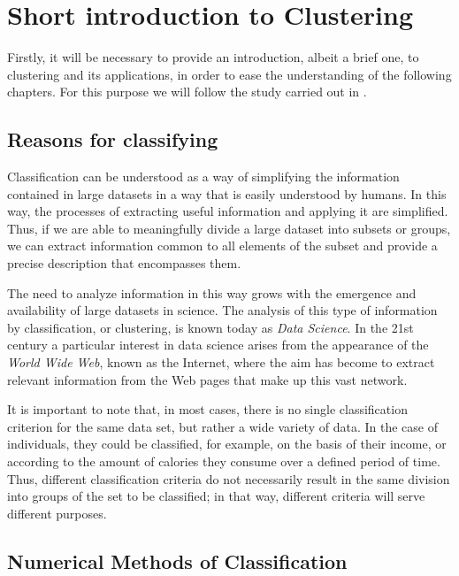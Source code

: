 
\chapter{Short introduction to Clustering}\label{ch:IntroClustering}

Firstly, it will be necessary to provide an introduction, albeit a brief one, to clustering and its applications, in order to ease the understanding of the following chapters. For this purpose we will follow the study carried out in \cite{Everitt:2009:CA:1538772}.

\section{Reasons for classifying}

Classification can be understood as a way of simplifying the information contained in large datasets in a way that is easily understood by humans. In this way, the processes of extracting useful information and applying it are simplified. Thus, if we are able to meaningfully divide a large dataset into subsets or groups, we can extract information common to all elements of the subset and provide a precise description that encompasses them.

The need to analyze information in this way grows with the emergence and availability of large datasets in science. The analysis of this type of information by classification, or clustering, is known today as \textit{Data Science}. In the 21st century a particular interest in data science arises from the appearance of the \textit{World Wide Web}, known as the Internet, where the aim has become to extract relevant information from the Web pages that make up this vast network.

It is important to note that, in most cases, there is no single classification criterion for the same data set, but rather a wide variety of data. In the case of individuals, they could be classified, for example, on the basis of their income, or according to the amount of calories they consume over a defined period of time. Thus, different classification criteria do not necessarily result in the same division into groups of the set to be classified; in that way, different criteria will serve different purposes.

\section{Numerical Methods of Classification}

